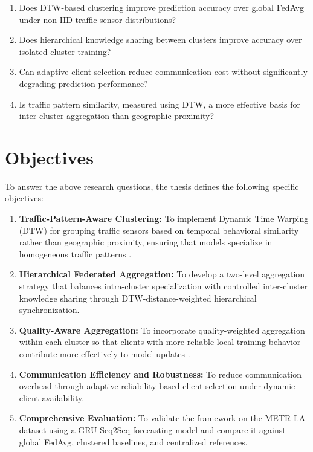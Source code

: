 \begin{enumerate}
    \item Does DTW-based clustering improve prediction accuracy over global FedAvg under non-IID traffic sensor distributions?
    \item Does hierarchical knowledge sharing between clusters improve accuracy over isolated cluster training?
    \item Can adaptive client selection reduce communication cost without significantly degrading prediction performance?
    \item Is traffic pattern similarity, measured using \ac{DTW}, a more effective basis for inter-cluster aggregation than geographic proximity?
\end{enumerate}

\section{Objectives}
To answer the above research questions, the thesis defines the following specific objectives:
\begin{enumerate}
    \item \textbf{Traffic-Pattern-Aware Clustering:} To implement Dynamic Time Warping (DTW) for grouping traffic sensors based on temporal behavioral similarity rather than geographic proximity, ensuring that models specialize in homogeneous traffic patterns \cite{feng2024}.
    
    \item \textbf{Hierarchical Federated Aggregation:} To develop a two-level aggregation strategy that balances intra-cluster specialization with controlled inter-cluster knowledge sharing through DTW-distance-weighted hierarchical synchronization.
    
    \item \textbf{Quality-Aware Aggregation:} To incorporate quality-weighted aggregation within each cluster so that clients with more reliable local training behavior contribute more effectively to model updates \cite{dai2024}.
    
    \item \textbf{Communication Efficiency and Robustness:} To reduce communication overhead through adaptive reliability-based client selection under dynamic client availability.
    
    \item \textbf{Comprehensive Evaluation:} To validate the framework on the METR-LA dataset using a GRU \ac{Seq2Seq} forecasting model \cite{zhu2025cmba} and compare it against global FedAvg, clustered baselines, and centralized references.
\end{enumerate}


